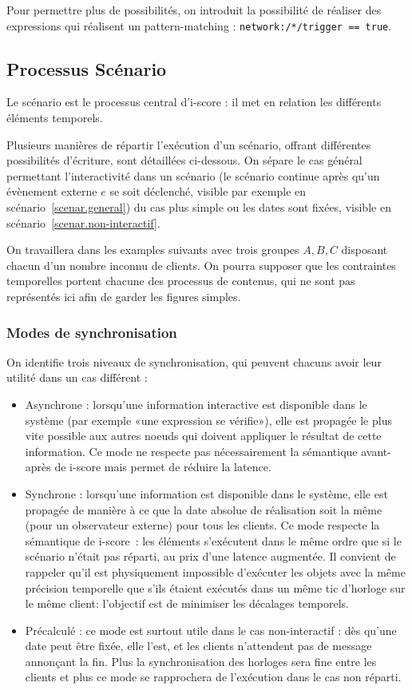 \documentclass{article}
\begin{document}
Pour permettre plus de possibilités, on introduit la possibilité de réaliser des expressions qui réalisent un pattern-matching : 
\lstinline|network:/*/trigger == true|.

\subsection{Processus Scénario}
Le scénario est le processus central d'i-score : il met en relation les différents éléments temporels.

Plusieurs manières de répartir l'exécution d'un scénario, offrant différentes possibilités d'écriture, sont détaillées ci-dessous. On sépare le cas général permettant l'interactivité dans un scénario (le scénario continue après qu'un évènement externe $e$ se soit déclenché, visible par exemple en scénario~\ref{scenar.general}) du cas plus simple ou les dates sont fixées, visible en scénario~\ref{scenar.non-interactif}.

On travaillera dans les examples suivants avec trois groupes $A,B,C$ disposant chacun d'un nombre inconnu de clients. 
On pourra supposer que les contraintes temporelles portent chacune des processus de contenus, qui ne sont pas représentés ici afin de garder les figures simples.

\subsubsection{Modes de synchronisation}
On identifie trois niveaux de synchronisation, qui peuvent chacuns avoir leur utilité dans un cas différent : 
\begin{itemize}
    \item Asynchrone : lorsqu'une information interactive est disponible dans le système (par exemple «une expression se vérifie»), elle est propagée le plus vite possible aux autres noeuds qui doivent appliquer le résultat de cette information. Ce mode ne respecte pas nécessairement la sémantique avant-après de i-score mais permet de réduire la latence.
    \item Synchrone : lorsqu'une information est disponible dans le système, elle est propagée de manière à ce que la date absolue de réalisation soit  la même (pour un observateur externe) pour tous les clients. 
    Ce mode respecte la sémantique de i-score~: les éléments s'exécutent dans le même ordre que si le scénario n'était pas réparti, au prix d'une latence augmentée.    
    Il convient de rappeler qu'il est physiquement impossible d'exécuter les objets avec la même précision temporelle que s'ils étaient exécutés dans un même tic d'horloge sur le même client: l'objectif est de minimiser les décalages temporels.
    \item Précalculé : ce mode est surtout utile dans le cas non-interactif : dès qu'une date peut être fixée, elle l'est, et les clients n'attendent pas de message annonçant la fin. 
    Plus la synchronisation des horloges sera fine entre les clients et plus ce mode se rapprochera de l'exécution dans le cas non réparti.
\end{itemize}
\end{document}
